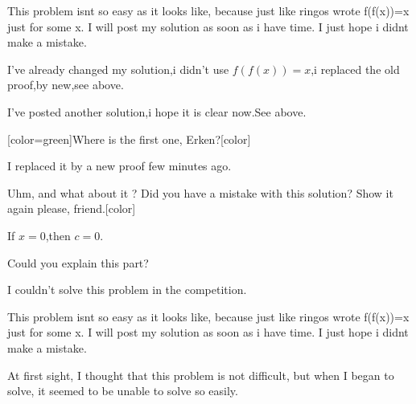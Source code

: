\begin{solution}
	\begin{tcolorbox}This problem isnt so easy as it looks like, because just like ringos wrote f(f(x))=x just for some x.  I will post my solution as soon as i have time. I just hope i didnt make a mistake.\end{tcolorbox}
I've already changed my solution,i didn't use $ f(f(x))=x$,i replaced the old proof,by new,see above.
\end{solution}



\begin{solution}
	\begin{tcolorbox}I've posted another solution,i hope it is clear now.See above.\end{tcolorbox}

[color=green]Where is the first one, Erken?[\/color]
\end{solution}



\begin{solution}
	I replaced it by a new proof few minutes ago.
\end{solution}



\begin{solution}Uhm, and what about it ? Did you have a mistake with this solution? Show it again please, friend.[\/color]
\end{solution}



\begin{solution}
	\begin{tcolorbox}
If $ x = 0$,then $ c = 0$.
\end{tcolorbox}

Could you explain this part?

I couldn't solve this problem in the competition.
\end{solution}



\begin{solution}
	\begin{tcolorbox}This problem isnt so easy as it looks like, because just like ringos wrote f(f(x))=x just for some x.  I will post my solution as soon as i have time. I just hope i didnt make a mistake.\end{tcolorbox}

At first sight, I thought that this problem is not difficult, but when I began to solve, it seemed to be unable to solve so easily.
\end{solution}



